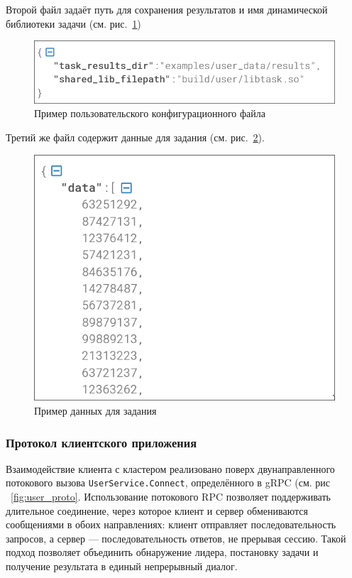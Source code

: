 Второй файл задаёт путь для сохранения результатов и имя динамической
библиотеки задачи (см. рис.~\ref{fig:user_config})

\begin{figure}
  \centering
  \includegraphics[scale=0.4]{inc/user-config.png}
  \caption{Пример пользовательского конфигурационного файла}
  \label{fig:user_config}
\end{figure}

Третий же файл содержит данные для задания (см. рис.~\ref{fig:user_data}).

\begin{figure}
  \centering
  \includegraphics[scale=0.4]{inc/user-data.png}
  \caption{Пример данных для задания}
  \label{fig:user_data}
\end{figure}

\subsubsection{Протокол клиентского приложения}

Взаимодействие клиента с кластером реализовано поверх двунаправленного
потокового вызова \texttt{UserService.Connect}, определённого в gRPC (см. рис
~\ref{fig:user_proto}. Использование потокового RPC позволяет поддерживать
длительное соединение, через которое клиент и сервер обмениваются сообщениями в
обоих направлениях: клиент отправляет последовательность запросов, а сервер —
последовательность ответов, не прерывая сессию. Такой подход позволяет
объединить обнаружение лидера, постановку задачи и получение результата в
единый непрерывный диалог.

